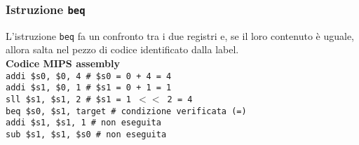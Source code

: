 \documentclass[../main.tex]{subfiles}
\begin{document}
\vspace*{2mm}

\subsubsection{Istruzione \texttt{beq}}
L'istruzione \texttt{beq} fa un confronto tra i due registri e, se il loro contenuto
è uguale, allora salta nel pezzo di codice identificato dalla label.
\\[2mm]
\textbf{Codice MIPS assembly} \\
\texttt{addi \$s0, \$0, 4 \hspace*{0cm} \hspace*{0cm} \hspace*{0cm} \hspace*{0cm} \hspace*{0cm} \hspace*{0cm} \# \$s0 = 0 + 4 = 4} \\
\texttt{addi \$s1, \$0, 1 \hspace*{0cm} \hspace*{0cm} \hspace*{0cm} \hspace*{0cm} \hspace*{0cm} \hspace*{0cm} \# \$s1 = 0 + 1 = 1} \\
\texttt{sll \$s1, \$s1, 2 \hspace*{0cm} \hspace*{0cm} \hspace*{0cm} \hspace*{0cm} \hspace*{0cm} \hspace*{0cm} \# \$s1 = 1 $<<$ 2 = 4} \\
\texttt{beq \$s0, \$s1, target \hspace*{0cm} \# condizione verificata (=)} \\
\texttt{addi \$s1, \$s1, 1 \hspace*{0cm} \hspace*{0cm} \hspace*{0cm} \hspace*{0cm} \hspace*{0cm} \# non eseguita} \\
\texttt{sub \$s1, \$s1, \$s0 \hspace*{0cm} \hspace*{0cm} \hspace*{0cm} \hspace*{0cm} \# non eseguita} \\
\end{document}
